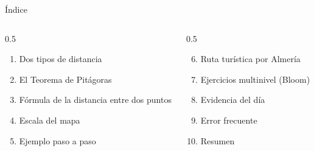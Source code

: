 \documentclass[aspectratio=169, 10pt, spanish]{beamer}
\begin{document}
\begin{frame}[plain]\titlepage\end{frame}

\begin{frame}{Índice}
  \begin{columns}[t]
    \begin{column}{0.5\textwidth}
      \begin{enumerate}
        \item Dos tipos de distancia
        \item El Teorema de Pitágoras
        \item Fórmula de la distancia entre dos puntos
        \item Escala del mapa
        \item Ejemplo paso a paso
      \end{enumerate}
    \end{column}
    \begin{column}{0.5\textwidth}
      \begin{enumerate}\setcounter{enumi}{5}
        \item Ruta turística por Almería
        \item Ejercicios multinivel (Bloom)
        \item Evidencia del día
        \item Error frecuente
        \item Resumen
      \end{enumerate}
    \end{column}
  \end{columns}
\end{frame}

\end{document}
